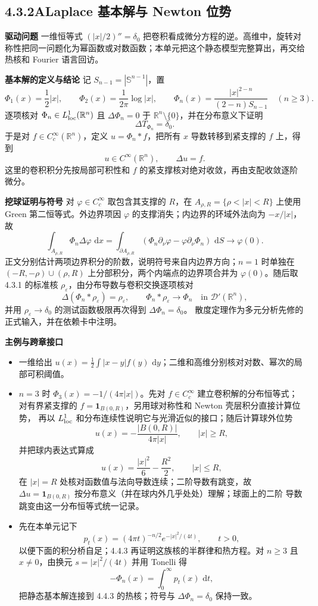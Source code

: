 \documentclass[11pt,a4paper]{ctexart}
\newcommand{\R}{\mathbb R}
\newcommand{\eps}{\varepsilon}
\newcommand{\dd}{\,\mathrm d}
\newcommand{\planitem}[1]{\par\smallskip\noindent\textcolor{deepblue}{\textbf{#1}}\quad}
\newcommand{\unithead}[2]{\subsection{#1\quad #2}}
\begin{document}
\unithead{4.3.2A}{Laplace 基本解与 Newton 位势}

\planitem{驱动问题}
一维恒等式 $(|x|/2)''=\delta_0$ 把卷积看成微分方程的逆。高维中，旋转对称性把同一问题化为幂函数或对数函数；本单元把这个静态模型完整算出，再交给热核和 Fourier 语言回访。

\planitem{基本解的定义与结论}
记 $S_{n-1}=|\mathbb S^{n-1}|$，置
\[
 \Phi_1(x)=\frac12|x|,\qquad
 \Phi_2(x)=\frac1{2\pi}\log|x|,\qquad
 \Phi_n(x)=\frac{|x|^{2-n}}{(2-n)S_{n-1}}\quad(n\ge3).
\]
逐项核对 $\Phi_n\in L^1_{\rm loc}(\R^n)$ 且 $\Delta\Phi_n=0$ 于 $\R^n\setminus\{0\}$，并在分布意义下证明
\[
 \Delta T_{\Phi_n}=\delta_0.
\]
于是对 $f\in C_c^\infty(\R^n)$，定义
$u=\Phi_n*f$，把所有 $x$ 导数转移到紧支撑的 $f$ 上，得到
\[
 u\in C^\infty(\R^n),\qquad \Delta u=f.
\]
这里的卷积积分先按局部可积性和 $f$ 的紧支撑核对绝对收敛，再由支配收敛逐阶微分。

\planitem{挖球证明与符号}
对 $\varphi\in C_c^\infty$ 取包含其支撑的 $R$，在
$A_{\rho,R}=\{\rho<|x|<R\}$ 上使用 Green 第二恒等式。外边界项因 $\varphi$ 的支撑消失；内边界的环域外法向为 $-x/|x|$，故
\[
 \int_{A_{\rho,R}}\Phi_n\Delta\varphi\,\dd x
 =\int_{\partial A_{\rho,R}}
   (\Phi_n\partial_\nu\varphi-\varphi\partial_\nu\Phi_n)\,\dd S
 \longrightarrow\varphi(0).
\]
正文分别估计两项边界积分的阶数，说明符号来自内边界方向；$n=1$ 时单独在
 $(-R,-\rho)\cup(\rho,R)$ 上分部积分，两个内端点的边界项合并为
$\varphi(0)$。随后取 4.3.1 的标准核 $\rho_\eps$，由分布导数与卷积交换逐项核对
\[
 \Delta(\Phi_n*\rho_\eps)=\rho_\eps,
 \qquad \Phi_n*\rho_\eps\longrightarrow\Phi_n\quad\text{in }\mathcal D'(\R^n),
\]
并用 $\rho_\eps\to\delta_0$ 的测试函数极限再次得到 $\Delta\Phi_n=\delta_0$。
散度定理作为多元分析先修的正式输入，并在依赖卡中注明。

\planitem{主例与跨章接口}
\begin{itemize}
\item 一维给出 $u(x)=\frac12\int|x-y|f(y)\,\dd y$；二维和高维分别核对对数、幂次的局部可积阈值。
\item $n=3$ 时 $\Phi_3(x)=-1/(4\pi|x|)$。先对 $f\in C_c^\infty$ 建立卷积解的分布恒等式；
对有界紧支撑的 $f=\mathbf1_{B(0,R)}$，另用球对称性和 Newton 壳层积分直接计算位势，
再以 $L^1_{\rm loc}$ 和分布连续性说明它与光滑近似的接口；随后计算球外位势
\[
 u(x)=-\frac{|B(0,R)|}{4\pi|x|},\qquad |x|\ge R,
\]
并把球内表达式算成
\[
 u(x)=\frac{|x|^2}{6}-\frac{R^2}{2},\qquad |x|\le R,
\]
在 $|x|=R$ 处核对函数值与法向导数连续；二阶导数有跳变，故
$\Delta u=\mathbf1_{B(0,R)}$ 按分布意义（并在球内外几乎处处）理解；球面上的二阶
导数跳变由这一分布恒等式统一记录。
\item 先在本单元记下
\[
p_t(x)=(4\pi t)^{-n/2}e^{-|x|^2/(4t)},\qquad t>0,
\]
以便下面的积分桥自足；4.4.3 再证明这族核的半群律和热方程。对
$n\ge3$ 且 $x\ne0$，由换元 $s=|x|^2/(4t)$ 并用 Tonelli 得
\[
-\Phi_n(x)=\int_0^\infty p_t(x)\,\dd t,
\]
把静态基本解连接到 4.4.3 的热核；符号与 $\Delta\Phi_n=\delta_0$ 保持一致。
\end{itemize}
\end{document}
